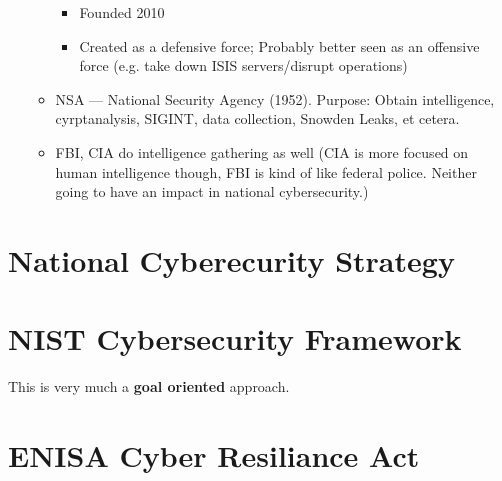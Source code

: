 \documentclass[11pt]{article}
\begin{document}
\begin{itemize}
\begin{itemize}
\begin{itemize}
            \item Founded 2010
            \item Created as a defensive force; Probably better seen as an offensive force (e.g. take down ISIS servers/disrupt operations)
        \end{itemize}
        \item NSA --- National Security Agency (1952). Purpose: Obtain intelligence, cyrptanalysis, SIGINT, data collection, Snowden Leaks, et cetera. 
        \item FBI, CIA do intelligence gathering as well (CIA is more focused on human intelligence though, FBI is kind of like federal police. Neither going to have an impact in national cybersecurity.)
    \end{itemize}
\end{itemize}



\section{National Cyberecurity Strategy}

\section{NIST Cybersecurity Framework}

This is very much a {\bf goal oriented} approach.

\section{ENISA Cyber Resiliance Act}
\end{document}
